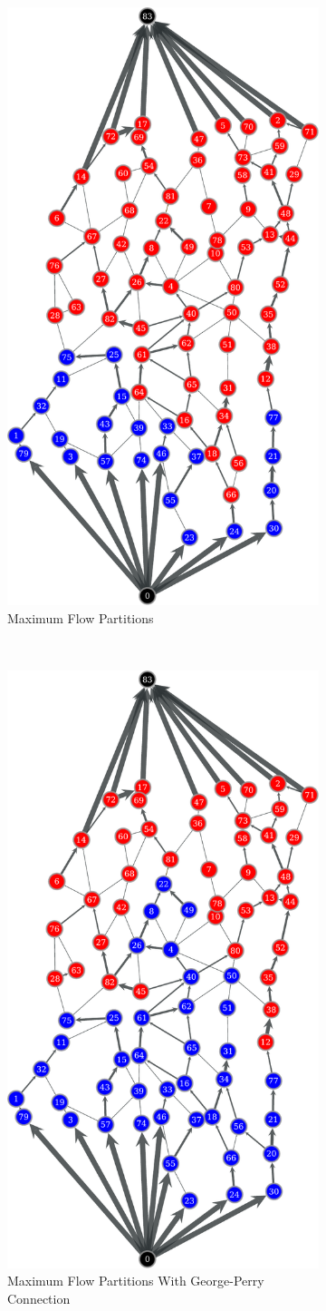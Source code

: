 \documentclass[titlepage]{article}
\begin{document}
    \begin{figure}[H]
      \center
      \begin{subfigure}[b]{0.5\textwidth}
        \center
        \includegraphics[width=.5\textwidth]{figures/old_maxflow-crop.pdf}
        \caption*{Maximum Flow Partitions}
        \label{fig:oldmaxflow}
      \end{subfigure}~
      \begin{subfigure}[b]{0.5\textwidth}
        \center
        \includegraphics[width=.5\textwidth]{figures/maxflow_directed-crop.pdf}
        \caption*{Maximum Flow Partitions With George-Perry Connection}
        \label{fig:newmaxflow}
      \end{subfigure}
      \caption{}
    \end{figure}
\end{document}
